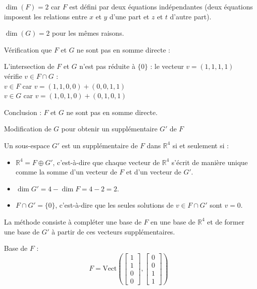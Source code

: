 \documentclass[10pt,a4paper]{article}
\begin{document}
\( \dim(F) = 2 \) car $F$ est défini par deux équations indépendantes (deux équations imposent les relations entre $x$ et
$y$ d'une part et $z$ et $t$ d'autre part).

\( \dim(G) = 2 \) pour les mêmes raisons.

\q Vérification que $F$ et $G$ ne sont pas en somme directe :

L'intersection de \( F \) et \( G \) n'est pas réduite à \(\{0\}\) : le vecteur \( v = (1, 1, 1, 1)
\) vérifie \( v \in F \cap G \) :\\
\( v \in F \) car \( v = (1, 1, 0, 0) + (0, 0, 1, 1) \)\\
\( v \in G \) car \( v = (1, 0, 1, 0) + (0, 1, 0, 1) \)

Conclusion : \( F \) et \( G \) ne sont pas en somme directe.

\q Modification de \( G \) pour obtenir un supplémentaire \( G' \) de \( F \)

Un sous-espace \( G' \) est un supplémentaire de \( F \) dans \( \mathbb{R}^4 \) si et seulement si
:
\begin{itemize}
    \item \( \mathbb{R}^4 = F \oplus G' \), c'est-à-dire que chaque vecteur de \( \mathbb{R}^4 \)
    s'écrit de manière unique comme la somme d'un vecteur de \( F \) et d'un vecteur de \( G' \).
    \item \( \dim G' = 4 - \dim F = 4 - 2 = 2 \).
    \item \( F \cap G' = \{0\} \), c'est-à-dire que les seules solutions de \( v \in F \cap G' \)
    sont \( v = 0 \).
\end{itemize}

La méthode consiste à compléter une base de \( F \) en une base de \( \mathbb{R}^4 \) et de former
une base de \( G' \) à partir de ces vecteurs supplémentaires.

Base de \( F \) :
\[
F = \text{Vect} \left( \begin{bmatrix} 1 \\ 1 \\ 0 \\ 0 \end{bmatrix}, \begin{bmatrix} 0 \\ 0 \\ 1 \\ 1 \end{bmatrix} \right)
\]
\end{document}
